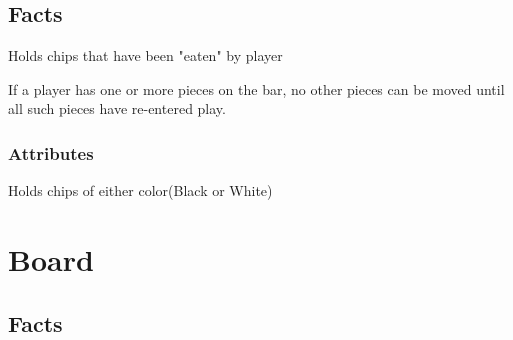 \documentclass{report}
\begin{document}
\subsection{Facts}
\begin{dashed}
	\item Holds chips that have been "eaten" by player
	\item If a player has one or more pieces on the bar,
	 no other pieces can be moved until all such pieces
	 have re-entered play.
\end{dashed}

\subsubsection{Attributes}
\begin{dashed}
	\item Holds chips of either color(Black or White)
\end{dashed}

\section{Board}

\subsection{Facts}
\end{document}
